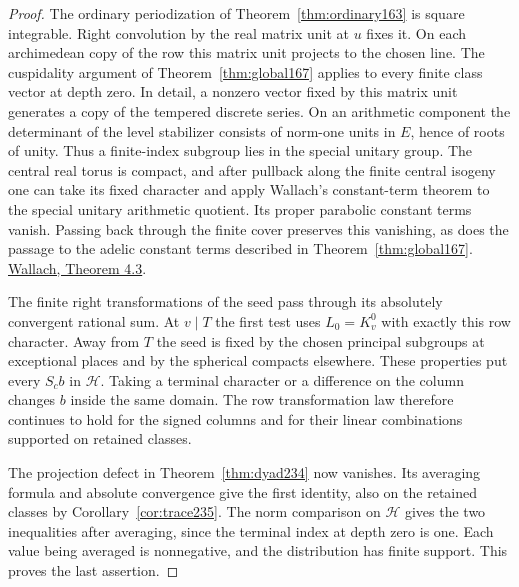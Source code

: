 \documentclass[a4paper,11pt]{article}
\theoremstyle{definition}
\theoremstyle{remark}
\numberwithin{equation}{section}
\begin{document}
\begin{proof}
The ordinary periodization of Theorem~\ref{thm:ordinary163}
is square integrable. Right convolution by the real matrix unit
at \(u\) fixes it. On each archimedean copy of the row this matrix
unit projects to the chosen line. The cuspidality argument of
Theorem~\ref{thm:global167} applies to every finite class vector
at depth zero. In detail, a nonzero vector fixed by this
matrix unit generates a copy of the tempered discrete series.
On an arithmetic component the determinant of the level
stabilizer consists of norm-one units in \(E\), hence of roots
of unity. Thus a finite-index subgroup lies in the special
unitary group. The central real torus is compact, and after
pullback along the finite central isogeny one can take its
fixed character and apply Wallach's constant-term theorem to
the special unitary arithmetic quotient. Its proper parabolic
constant terms vanish. Passing back through the finite cover
preserves this vanishing, as does the passage to the adelic
constant terms described in Theorem~\ref{thm:global167}.
\href{https://mathweb.ucsd.edu/~nwallach/tempered-cuspidal.pdf}{Wallach,
Theorem 4.3}.

The finite right transformations of the seed pass through its
absolutely convergent rational sum. At \(v\mid T\) the first
test uses \(L_0=K^0_v\) with exactly this row character.
Away from \(T\) the seed is fixed by the chosen principal
subgroups at exceptional places and by the spherical compacts
elsewhere. These properties put every \(S_cb\) in \(\mathcal H\).
Taking a terminal character or a difference on the column changes
\(b\) inside the same domain. The row transformation law therefore
continues to hold for the signed columns and for their linear
combinations supported on retained classes.

The projection defect in Theorem~\ref{thm:dyad234} now vanishes.
Its averaging formula and absolute convergence give the first
identity, also on the retained classes by Corollary~\ref{cor:trace235}.
The norm comparison on \(\mathcal H\) gives the two inequalities
after averaging, since the terminal index at depth zero is one.
Each value being averaged is nonnegative, and the distribution
has finite support. This proves the last assertion.
\end{proof}
\end{document}
